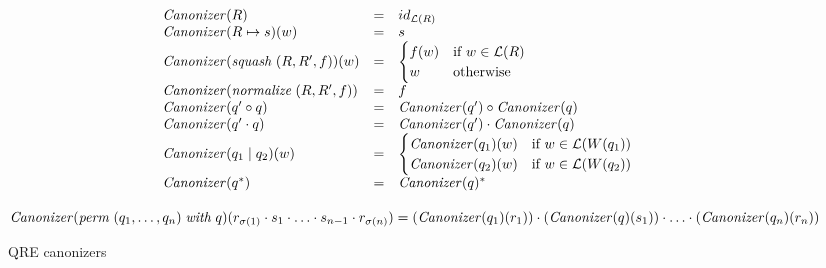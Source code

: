 \documentclass{svproc}
\newcommand{\squash}[3]{\ensuremath{\mathit{squash} \; (#1, #2, #3)}}
\newcommand{\perm}[2]{\ensuremath{\mathit{perm}\; (#1)\; \mathit{with}\; #2}}
\newcommand{\normalize}[3]{\ensuremath{\mathit{normalize} \; (#1, #2, #3)}}
\newcommand{\sep}{\ensuremath{\; | \;}}
\newcommand{\canonizer}{\ensuremath{\mathit{Canonizer}}}
\begin{document}
\begin{figure}[t]
  \begin{center}
    \[
      \begin{array}{l@\quad l @\quad l} 
        \canonizer(R) &=& id_{\mathcal{L}(R)} \\
        \canonizer(R \mapsto s)(w) &=& s\\
        \canonizer(\squash{R}{R'}{f})(w) &=& 
                                             \begin{cases}
                                               f(w) & \text{if } w \in \mathcal{L}(R)\\
                                               w & \text{otherwise}
                                             \end{cases}\\
        \canonizer(\normalize{R}{R'}{f}) &=& f\\
        \canonizer(q' \circ q) &=& \canonizer(q') \circ \canonizer(q)\\
        \canonizer(q' \cdot q) &=& \canonizer(q') \cdot \canonizer(q)\\
        \canonizer(q_1 \sep q_2)(w) &=& 
                                        \begin{cases}
                                          \canonizer(q_1)(w) & \text{if } w \in \mathcal{L}(W(q_1))\\
                                          \canonizer(q_2)(w) & \text{if } w \in \mathcal{L}(W(q_2))\\
                                        \end{cases}\\
        \canonizer(q^*) &=& \canonizer(q)^* \\
      \end{array}
    \]
  \end{center}
  $\canonizer(\perm{q_1, \ldots, q_n}{q})(r_{\sigma(1)}
  \cdot s_1 \cdot \ldots \cdot s_{n-1} \cdot r_{\sigma(n)}) \newline
  = (\canonizer(q_1)(r_1)) \cdot (\canonizer(q)(s_1)) \cdot \ldots \cdot
  (\canonizer(q_n)(r_n))$
  \caption{QRE canonizers}
  \label{fig:canonizers}
\end{figure}
\end{document}
